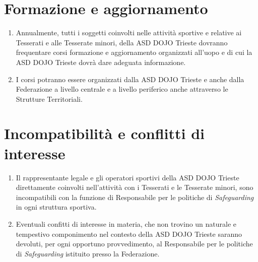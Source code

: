 \documentclass{djtsasddoc}
\begin{document}
	\section{Formazione e aggiornamento}
	\begin{enumerate}
		\item Annualmente, tutti i soggetti coinvolti nelle attività sportive e relative ai Tesserati e alle Tesserate minori, della ASD DOJO Trieste dovranno frequentare corsi formazione e aggiornamento organizzati all'uopo e di cui la ASD DOJO Trieste dovrà dare adeguata informazione.
		\item I corsi potranno essere organizzati dalla ASD DOJO Trieste e anche dalla Federazione a livello centrale e a livello periferico anche attraverso le Strutture Territoriali.
	\end{enumerate}
	
	\section{Incompatibilità e conflitti di interesse}
	\begin{enumerate}
		\item Il rappresentante legale e gli operatori sportivi della ASD DOJO Trieste direttamente coinvolti nell'attività con i Tesserati e le Tesserate minori, sono incompatibili con la funzione di Responsabile per le politiche di \textit{Safeguarding} in ogni struttura sportiva.
		\item Eventuali confitti di interesse in materia, che non trovino un naturale e tempestivo componimento nel contesto della ASD DOJO Trieste saranno devoluti, per ogni opportuno provvedimento, al Responsabile per le politiche di \textit{Safeguarding} istituito presso la Federazione.
	\end{enumerate}
	
\end{document}
